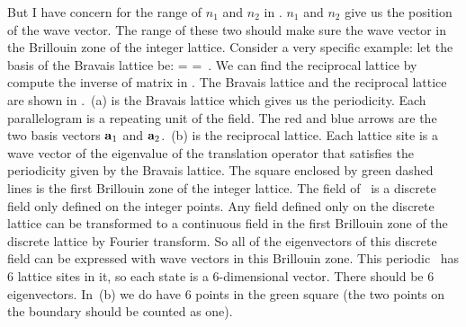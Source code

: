 \begin{description}
{But I have concern for the range of $n_1$ and $n_2$ in
. $n_1$ and $n_2$ give us the position of the wave
vector. The range of these two should make sure the wave vector in the
Brillouin zone of the integer lattice. Consider a very specific example:
let the basis of the Bravais lattice be:
\beq
\left[
\begin{array}{cc}
{\bf a}_1 & {\bf a}_2 \\
\end{array}
\right]
=
\left[
\begin{array}{cc}
 l_1 & l_2 \\
 0 & l_3 \\
\end{array}
\right]
=
\left[
\begin{array}{cc}
3 & 1 \\
 0 & 2 \\
\end{array}
\right]
 \,.
We can find the reciprocal lattice by compute the inverse of matrix in
. The Bravais lattice and the reciprocal lattice
are shown in .
\,(a) is the Bravais lattice which gives
us the periodicity. Each parallelogram is a repeating unit of the field.
The red and blue arrows are the two basis vectors ${\bf a}_1$ and ${\bf
a}_2$. \,(b) is the reciprocal lattice.
Each lattice site is a wave vector of the eigenvalue of the translation
operator that satisfies the periodicity given by the Bravais lattice. The
square enclosed by green dashed lines is the first Brillouin zone of the
integer lattice. The field of  \catlatt\ is a discrete field only defined
on the integer points. Any field defined only on the discrete lattice can
be transformed to a continuous field in the first Brillouin zone of the
discrete lattice by Fourier transform. So all of the eigenvectors of this
discrete field can be expressed with wave vectors in this Brillouin zone.
This periodic \brick\ has 6 lattice sites in it, so each state is a
6-dimensional vector. There should be 6 eigenvectors. In
\,(b) we do have 6 points in the green
square (the two points on the boundary should be counted as one).

}
\end{description}

